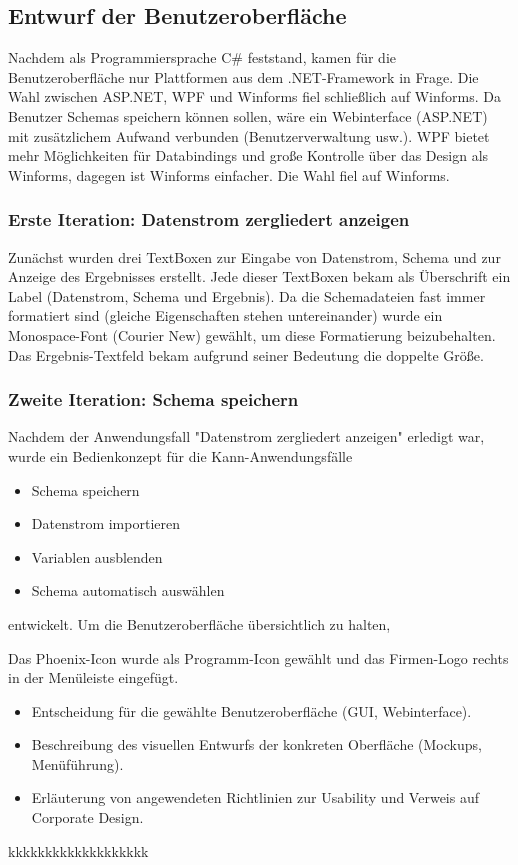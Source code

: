 \subsection{Entwurf der Benutzeroberfläche}
\label{sec:Benutzeroberflaeche}
Nachdem als Programmiersprache C\# feststand, kamen für die Benutzeroberfläche nur  Plattformen aus dem .NET-Framework in Frage. Die Wahl zwischen ASP.NET, WPF und Winforms fiel schließlich auf Winforms. Da Benutzer Schemas speichern können sollen, wäre ein Webinterface (ASP.NET) mit zusätzlichem Aufwand verbunden (Benutzerverwaltung usw.). WPF bietet mehr Möglichkeiten für Databindings und große Kontrolle über das Design als Winforms, dagegen ist Winforms einfacher. Die Wahl fiel auf Winforms.

\subsubsection{Erste Iteration: Datenstrom zergliedert anzeigen}
\label{sec:BenutzeroberflaecheZergliedern}
Zunächst wurden drei TextBoxen zur Eingabe von Datenstrom, Schema und zur Anzeige des Ergebnisses erstellt. Jede dieser TextBoxen bekam als Überschrift ein Label (Datenstrom, Schema und Ergebnis). Da die Schemadateien fast immer formatiert sind (gleiche Eigenschaften stehen untereinander) wurde ein Monospace-Font (Courier New) gewählt, um diese Formatierung beizubehalten. Das Ergebnis-Textfeld bekam aufgrund seiner Bedeutung die doppelte Größe.

\subsubsection{Zweite Iteration: Schema speichern}
\label{BenutzeroberflaecheSpeichern}
Nachdem der Anwendungsfall "Datenstrom zergliedert anzeigen" erledigt war, wurde ein Bedienkonzept für die Kann-Anwendungsfälle
\begin{itemize}
\item Schema speichern
\item Datenstrom importieren
\item Variablen ausblenden
\item Schema automatisch auswählen
\end{itemize}
entwickelt. Um die Benutzeroberfläche übersichtlich zu halten, 

Das Phoenix-Icon wurde als Programm-Icon gewählt und das Firmen-Logo rechts in der Menüleiste eingefügt.

\begin{itemize}
	\item Entscheidung für die gewählte Benutzeroberfläche (\zB GUI, Webinterface).
	\item Beschreibung des visuellen Entwurfs der konkreten Oberfläche (\zB Mockups, Menüführung).
	\item \Ggfs Erläuterung von angewendeten Richtlinien zur Usability und Verweis auf Corporate Design.
\end{itemize}kkkkkkkkkkkkkkkkkkk



